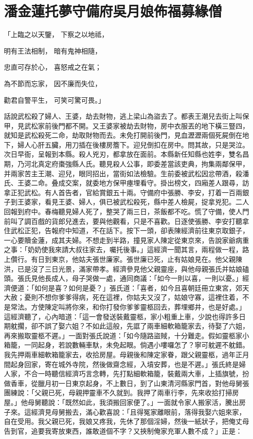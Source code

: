 %

\chapter{潘金蓮托夢守備府\KG 吳月娘佈福募緣僧}

「上臨之以天鑒，  下察之以地祗，

明有王法相制，  暗有鬼神相隨，

忠直可存於心，  喜怒戒之在氣；

為不節而忘家，  因不廉而失位，

勸君自警平生，  可笑可驚可畏。」

話說武松殺了婦人、王婆，劫去財物，逃上梁山為盜去了。都表王潮兒去街上叫保甲，見武松家前後門都不開。又王婆家被劫去財物，房中衣服丟的地下橫三豎四，就知是武松殺死二命，劫取財物而去。未免打開前後門，見血瀝瀝兩個死屍倒在地下，婦人心肝五臟，用刀插在後樓房簷下。迎兒倒扣在房中。問其故，只是哭泣。次日早衙，呈報到本縣。殺人兇刃，都拿放在面前。本縣新任知縣也姓李，雙名昌期，乃河北真定府棗強縣人氏。聽見殺人公事，即委差當該吏典，拘集兩鄰保甲，并兩家苦主王潮、迎兒，眼同招出，當街如法檢驗。生前委被武松因忿帶酒，殺潘氏、王婆二命。叠成交案，就委地方保甲瘞埋看守。掛出榜文，四廂差人跟尋，訪拿正犯武松。有人首告者，官給賞銀五十兩。守備府中張勝、李安，打着一百兩銀子到王婆家，看見王婆、婦人，俱已被武松殺死，縣中差人檢屍，捉拿兇犯。二人回報到府中。春梅聽見婦人死了，整哭了兩三日，茶飯都不吃。慌了守備，使人門前叫了調百戲的貨郎兒進去，要與他觀看，只是不喜歡。日逐使張勝、李安打聽拿住武松正犯，告報府中知道，不在話下。按下一頭，卻表陳經濟前往東京取銀子，一心要贖金蓮，成其夫婦。不想走到半路，撞見家人陳定從東京來，告說家爺病重之事：「奶奶使我來請大叔往家去，囑托後事。」這經濟一聞其言，兩程做一程，路上儹行。有日到東京，他姑夫張世廉家。張世廉已死，止有姑娘見在。他父親陳洪，已是沒了三日光景，滿家帶孝。經濟參見他父親靈座，與他母親張氏并姑娘磕頭。張氏見他長成人，母子哭做一處，通同商議：「如今一則以喜，一則以憂。」經濟便道：「如何是喜？如何是憂？」張氏道：「喜者，如今且喜朝廷冊立東宮，郊天大赦；憂則不想你爹爹得病，死在這裡，你姑夫又沒了，姑娘守寡，這裡住着，不是常法。方使陳定叫將你來，和你打發你爹爹靈柩回去，葬埋鄉井，也是好處。」這經濟聽了，心內暗道：「這一會發送裝戴靈柩，家小粗重上車，少說也得許多日期躭擱，卻不誤了娶六姐？不如此這般，先誆了兩車細軟箱籠家去，待娶了六姐，再來搬取靈柩不遲。」一面對張氏說道：「如今隨路盜賊，十分難走。假如靈柩家小箱籠，一同起身，若說數輛車馱，未免起眼。倘遇小嘍囉怎了？寧可躭遲不躭錯。我先押兩車細軟箱籠家去，收拾房屋。母親後和陳定家眷，跟父親靈柩，過年正月間起身回家，寄在城外寺院，然後做齋念經，入墳安葬，也是不遲。」張氏終是婦人家，不合一時聽信經濟巧言念轉，先打點細軟箱籠，裝戴兩大車，上插旗號，扮做香車，從臘月初一日東京起身，不上數日，到了山東清河縣家門首，對他母舅張團練說：「父親已死，母親押靈車不久就到。我押了兩車行李，先來收拾打掃房屋。」他母舅聽說：「既然如此，我須搬回家便了。」一面就令家人搬家活，騰出房子來。這經濟見母舅搬去，滿心歡喜說：「且得冤家離眼前，落得我娶六姐來家，自在受用。我父親已死，我娘又疼我，先休了那個淫婦，然後一紙狀子，把俺丈母告到官，追要我寄放東西，誰敢道個不字？又挾制俺家充軍人數不成？」正是：

